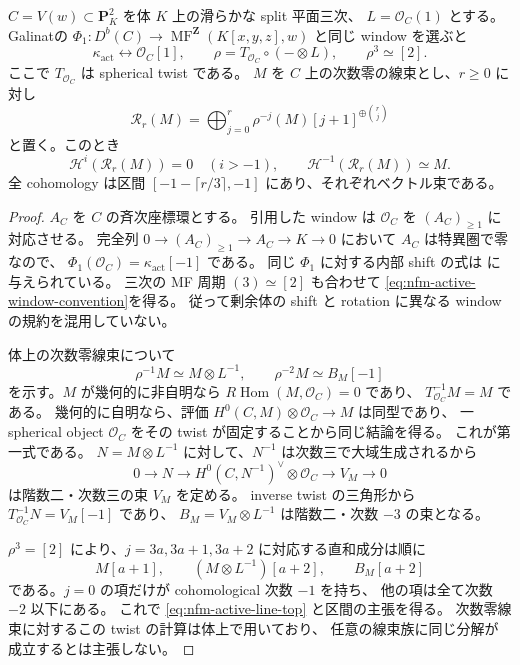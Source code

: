 \begin{lemma}
\label{lem:nfm-active-line-rotation}
$C=V(w)\subset\mathbf P^2_K$ を体 $K$ 上の滑らかな split 平面三次、
$L=\mathcal O_C(1)$ とする。
Galinat\cite[\S1.1, Lemma~1.2, \S1.4]{NFMGalinat}の
$\Phi_1:D^b(C)\to\operatorname{MF}^{\mathbf Z}(K[x,y,z],w)$
と同じ window を選ぶと
\begin{equation}
\label{eq:nfm-active-window-convention}
 \kappa_{\mathrm{act}}\longleftrightarrow\mathcal O_C[1],
 \qquad
 \rho=T_{\mathcal O_C}\circ(-\otimes L),
 \qquad
 \rho^3\simeq[2].
\end{equation}
ここで $T_{\mathcal O_C}$ は spherical twist である。
$M$ を $C$ 上の次数零の線束とし、$r\ge0$ に対し
\[
 \mathscr R_r(M)=
 \bigoplus_{j=0}^{r}\rho^{-j}(M)[j+1]^{\oplus\binom rj}
\]
と置く。このとき
\begin{equation}
\label{eq:nfm-active-line-top}
 \mathcal H^i(\mathscr R_r(M))=0\quad(i>-1),\qquad
 \mathcal H^{-1}(\mathscr R_r(M))\simeq M.
\end{equation}
全 cohomology は区間
$[-1-\lceil r/3\rceil,-1]$ にあり、それぞれベクトル束である。
\end{lemma}

\begin{proof}
$A_C$ を $C$ の斉次座標環とする。
引用した window は $\mathcal O_C$ を $(A_C)_{\ge1}$ に対応させる。
完全列
$0\to(A_C)_{\ge1}\to A_C\to K\to0$ において $A_C$ は特異圏で零なので、
$\Phi_1(\mathcal O_C)=\kappa_{\mathrm{act}}[-1]$ である。
同じ $\Phi_1$ に対する内部 shift の式は
\cite[\S1.4; Lemma~2.7 の証明]{NFMGalinat}に与えられている。
三次の MF 周期 $(3)\simeq[2]$ も合わせて
\eqref{eq:nfm-active-window-convention}を得る。
従って剰余体の shift と rotation に異なる window の規約を混用していない。

体上の次数零線束について
\[
 \rho^{-1}M\simeq M\otimes L^{-1},\qquad
 \rho^{-2}M\simeq B_M[-1]
\]
を示す。$M$ が幾何的に非自明なら
$R\operatorname{Hom}(M,\mathcal O_C)=0$ であり、
$T_{\mathcal O_C}^{-1}M=M$ である。
幾何的に自明なら、評価
$H^0(C,M)\otimes\mathcal O_C\to M$ は同型であり、
一 spherical object $\mathcal O_C$ をその twist が固定することから同じ結論を得る。
これが第一式である。
$N=M\otimes L^{-1}$ に対して、$N^{-1}$ は次数三で大域生成されるから
\[
 0\longrightarrow N
 \longrightarrow H^0(C,N^{-1})^\vee\otimes\mathcal O_C
 \longrightarrow V_M\longrightarrow0
\]
は階数二・次数三の束 $V_M$ を定める。
inverse twist の三角形から
$T_{\mathcal O_C}^{-1}N=V_M[-1]$ であり、
$B_M=V_M\otimes L^{-1}$ は階数二・次数 $-3$ の束となる。

$\rho^3=[2]$ により、$j=3a,3a+1,3a+2$ に対応する直和成分は順に
\[
 M[a+1],\qquad
 (M\otimes L^{-1})[a+2],\qquad
 B_M[a+2]
\]
である。$j=0$ の項だけが cohomological 次数 $-1$ を持ち、
他の項は全て次数 $-2$ 以下にある。
これで \eqref{eq:nfm-active-line-top} と区間の主張を得る。
次数零線束に対するこの twist の計算は体上で用いており、
任意の線束族に同じ分解が成立するとは主張しない。
\end{proof}

